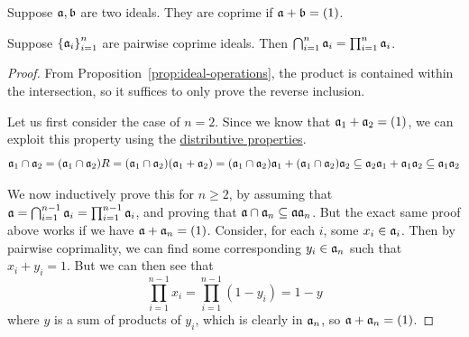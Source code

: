 \begin{definition}
    Suppose \(\mathfrak{a,b}\) are two ideals.
    They are coprime if \(\mathfrak{a}+\mathfrak{b} = (1)\).
\end{definition}
\begin{theorem}\label{thm:coprime-product-intersection}
    Suppose \({\{\mathfrak{a}_i\}}_{i=1}^n\) are pairwise coprime ideals.
    Then \(\bigcap_{i=1}^n \mathfrak{a}_i = \prod_{i=1}^n \mathfrak{a}_i\).
\end{theorem}
\begin{proof}
    From Proposition~\ref{prop:ideal-operations},
    the product is contained within the intersection,
    so it suffices to only prove the reverse inclusion.

    Let us first consider the case of \(n = 2\).
    Since we know that \(\mathfrak{a}_1+\mathfrak{a}_2 = (1)\),
    we can exploit this property using the \hyperref[prop:ideal-distributive]{distributive properties}.
    \begin{equation*}
        \mathfrak{a}_1 \cap \mathfrak{a}_2 = (\mathfrak{a}_1 \cap \mathfrak{a}_2)R
        = (\mathfrak{a}_1 \cap \mathfrak{a}_2)(\mathfrak{a}_1 + \mathfrak{a}_2)
        = (\mathfrak{a}_1 \cap \mathfrak{a}_2)\mathfrak{a}_1 + (\mathfrak{a}_1 \cap \mathfrak{a}_2)\mathfrak{a}_2
        \subseteq \mathfrak{a}_2 \mathfrak{a}_1 + \mathfrak{a}_1 \mathfrak{a}_2
        \subseteq \mathfrak{a}_1 \mathfrak{a}_2
    \end{equation*}

    We now inductively prove this for \(n \geq 2\),
    by assuming that \(\mathfrak{a} = \bigcap_{i=1}^{n-1} \mathfrak{a}_i = \prod_{i=1}^{n-1} \mathfrak{a}_i\),
    and proving that \(\mathfrak{a} \cap \mathfrak{a}_n \subseteq \mathfrak{a} \mathfrak{a}_n\).
    But the exact same proof above works if we have \(\mathfrak{a} + \mathfrak{a}_n = (1)\).
    Consider, for each \(i\), some \(x_i \in \mathfrak{a}_i\).
    Then by pairwise coprimality,
    we can find some corresponding \(y_i \in \mathfrak{a}_n\) such that \(x_i+y_i = 1\).
    But we can then see that
    \begin{equation*}
        \prod_{i=1}^{n-1} x_i = \prod_{i=1}^{n-1} (1-y_i) = 1 - y
    \end{equation*}
    where \(y\) is a sum of products of \(y_i\),
    which is clearly in \(\mathfrak{a}_n\),
    so \(\mathfrak{a} + \mathfrak{a}_n = (1)\).
\end{proof}

